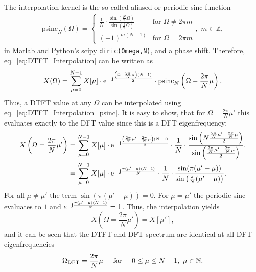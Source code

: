 \documentclass[11pt,a4paper,DIV=12]{scrartcl}
\begin{document}
%
The interpolation kernel is the so-called aliased or periodic sinc function
%
\begin{align}
\text{psinc}_N(\Omega)=\begin{cases}\frac{1}{N}\cdot\frac{\sin\left(\frac{N}{2}\Omega\right)}{\sin\left(\frac{1}{2}\Omega\right)}&\text{for }\Omega\neq2\pi m\\
(-1)^{m(N-1)}&\text{for }\Omega=2\pi m\end{cases},\,\,m\in\mathbb{Z},
\label{eq:periodic_sinc}
\end{align}
%
in Matlab and Python's scipy \texttt{diric(Omega,N)}, and a phase shift.
%
Therefore, eq.~\eqref{eq:DTFT_Interpolation} can be written as
%
\begin{equation}
X(\Omega)=\sum_{\mu=0}^{N-1}X[\mu]\cdot\e^{-\im\frac{\left(\Omega-\frac{2\pi}{N}\mu\right)(N-1)}{2}}\cdot\text{psinc}_N\left(\Omega-\frac{2\pi}{N}\mu\right).
\label{eq:DTFT_Interpolation_psinc}
\end{equation}
%
Thus, a DTFT value at any $\Omega$ can be interpolated using
eq.~\eqref{eq:DTFT_Interpolation_psinc}.
%
It is easy to show, that for $\Omega=\frac{2\pi}{N}\mu'$ this evaluates exactly
to the DFT value since this is a DFT eigenfrequency:
\begin{align}
X\left(\Omega=\frac{2\pi}{N}\mu'\right)&=\sum_{\mu=0}^{N-1}X[\mu]\cdot\e^{-\im\frac{\left(\frac{2\pi}{N}\mu'-\frac{2\pi}{N}\mu\right)(N-1)}{2}}\cdot\frac{1}{N}\cdot\frac{\sin\left(N\frac{\frac{2\pi}{N}\mu'-\frac{2\pi}{N}\mu}{2}\right)}{\sin\left(\frac{\frac{2\pi}{N}\mu'-\frac{2\pi}{N}\mu}{2}\right)},\\
&=\sum_{\mu=0}^{N-1}X[\mu]\cdot\e^{-\im\frac{\pi(\mu'-\mu)(N-1)}{N}}\cdot\frac{1}{N}\cdot\frac{\sin(\pi(\mu'-\mu))}{\sin\left(\frac{\pi}{N}(\mu'-\mu)\right)}.
\end{align}
%
For all $\mu\neq\mu'$ the term $\sin(\pi(\mu'-\mu))=0$.
%
For $\mu=\mu'$ the periodic sinc evaluates to $1$ and
$e^{-\im\frac{\pi(\mu'-\mu)(N-1)}{N}}=1$.
%
Thus, the interpolation yields
\begin{equation}
X\left(\Omega=\frac{2\pi}{N}\mu'\right)=X[\mu'],
\end{equation}
and it can be seen that the DTFT and DFT spectrum are identical at all DFT
eigenfrequencies
%
\begin{equation}
\Omega_\text{DFT}=\frac{2\pi}{N}\mu \hspace{5mm}\text{for}\hspace{5mm} 0\leq\mu\leq N-1,\,\,\mu\in\mathbb{N}.
\end{equation}
\end{document}
